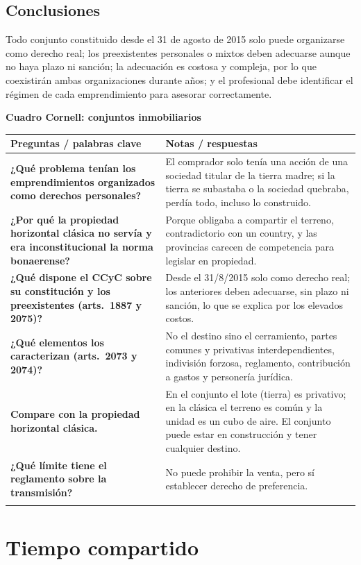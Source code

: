 \documentclass[12pt,oneside]{book}
\renewcommand{\arraystretch}{1.25}
\newcommand{\cq}[2]{\textbf{#1} & #2 \\[0.45em]}
\newcommand{\cornell}[3]{%
\par\bigskip\noindent\textbf{\large Cuadro Cornell: #1}\par\smallskip
\begin{center}
\small
\renewcommand{\arraystretch}{1.15}
\begin{tabularx}{\textwidth}{>{\raggedright\arraybackslash}p{0.27\textwidth}>{\raggedright\arraybackslash}X}
\toprule
\textbf{Preguntas / palabras clave} & \textbf{Notas / respuestas} \\
\midrule
#2
\midrule
\multicolumn{2}{p{\dimexpr\textwidth-2\tabcolsep\relax}}{\textbf{Resumen.} #3} \\
\bottomrule
\end{tabularx}
\end{center}
}
\begin{document}
\section{Conclusiones}

Todo conjunto constituido desde el 31 de agosto de 2015 solo puede organizarse como derecho real; los preexistentes personales o mixtos deben adecuarse aunque no haya plazo ni sanción; la adecuación es costosa y compleja, por lo que coexistirán ambas organizaciones durante años; y el profesional debe identificar el régimen de cada emprendimiento para asesorar correctamente.

\cornell{conjuntos inmobiliarios}{
\cq{¿Qué problema tenían los emprendimientos organizados como derechos personales?}{El comprador solo tenía una acción de una sociedad titular de la tierra madre; si la tierra se subastaba o la sociedad quebraba, perdía todo, incluso lo construido.}
\cq{¿Por qué la propiedad horizontal clásica no servía y era inconstitucional la norma bonaerense?}{Porque obligaba a compartir el terreno, contradictorio con un country, y las provincias carecen de competencia para legislar en propiedad.}
\cq{¿Qué dispone el CCyC sobre su constitución y los preexistentes (arts.~1887 y 2075)?}{Desde el 31/8/2015 solo como derecho real; los anteriores deben adecuarse, sin plazo ni sanción, lo que se explica por los elevados costos.}
\cq{¿Qué elementos los caracterizan (arts.~2073 y 2074)?}{No el destino sino el cerramiento, partes comunes y privativas interdependientes, indivisión forzosa, reglamento, contribución a gastos y personería jurídica.}
\cq{Compare con la propiedad horizontal clásica.}{En el conjunto el lote (tierra) es privativo; en la clásica el terreno es común y la unidad es un cubo de aire. El conjunto puede estar en construcción y tener cualquier destino.}
\cq{¿Qué límite tiene el reglamento sobre la transmisión?}{No puede prohibir la venta, pero sí establecer derecho de preferencia.}
}{Los conjuntos inmobiliarios son una propiedad horizontal especial con lote exclusivo, partes comunes, reglamento y persona jurídica. Desde 2015 solo pueden constituirse como derecho real y los anteriores deben adecuarse, aunque sin plazo ni sanción.}

\chapter[Tiempo compartido]{Tiempo compartido}\label{cap:tc}
\end{document}
